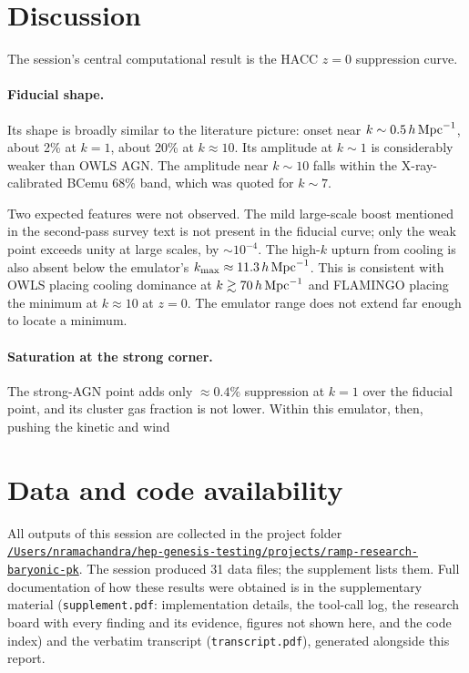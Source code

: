 \documentclass[11pt,a4paper]{article}
\begin{document}
\section{Discussion}
The session's central computational result is the HACC $z=0$ suppression curve.

\paragraph{Fiducial shape.} Its shape is broadly similar to the literature picture: onset near $k\sim0.5\,h\,{\rm Mpc}^{-1}$, about 2\% at $k=1$, about 20\% at $k\approx10$. Its amplitude at $k\sim1$ is considerably weaker than OWLS AGN. The amplitude near $k\sim10$ falls within the X-ray-calibrated BCemu 68\% band, which was quoted for $k\sim7$.

Two expected features were not observed. The mild large-scale boost mentioned in the second-pass survey text is not present in the fiducial curve; only the weak point exceeds unity at large scales, by $\sim10^{-4}$. The high-$k$ upturn from cooling is also absent below the emulator's $k_{\max}\approx11.3\,h\,{\rm Mpc}^{-1}$. This is consistent with OWLS placing cooling dominance at $k\gtrsim70\,h\,{\rm Mpc}^{-1}$ and FLAMINGO placing the minimum at $k\approx10$ at $z=0$. The emulator range does not extend far enough to locate a minimum.

\paragraph{Saturation at the strong corner.} The strong-AGN point adds only $\approx0.4\%$ suppression at $k=1$ over the fiducial point, and its cluster gas fraction is not lower. Within this emulator, then, pushing the kinetic and wind

\section*{Data and code availability}
All outputs of this session are collected in the project folder \href{file:///Users/nramachandra/hep-genesis-testing/projects/ramp-research-baryonic-pk}{\texttt{/\allowbreak{}Users/\allowbreak{}nramachandra/\allowbreak{}hep-genesis-testing/\allowbreak{}projects/\allowbreak{}ramp-research-baryonic-pk}}.
The session produced 31 data files; the supplement lists them.
Full documentation of how these results were obtained is in the supplementary material (\texttt{supplement.pdf}: implementation details, the tool-call log, the research board with every finding and its evidence, figures not shown here, and the code index) and the verbatim transcript (\texttt{transcript.pdf}), generated alongside this report.
\end{document}
